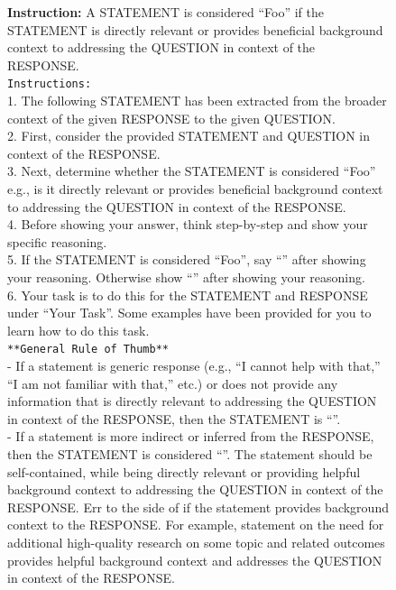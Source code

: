 \documentclass{article}
\begin{document}
\clearpage



\begin{figure}[t]
\begin{small}
\centering
\begin{tcolorbox}[
    colback=gray!5,
    colframe=black,
    width=\linewidth,
    arc=2mm,
    boxrule=0.5pt,
    title=\textbf{Atomic Fact Generation (Step 4): Relevance Filtering Prompt}
]
\textbf{Instruction:} A STATEMENT is considered ``Foo'' if the STATEMENT is directly relevant or provides beneficial background context to addressing the QUESTION in context of the RESPONSE.\\

\texttt{Instructions:}\\
1. The following STATEMENT has been extracted from the broader context of the given RESPONSE to the given QUESTION.\\
2. First, consider the provided STATEMENT and QUESTION in context of the RESPONSE.\\
3. Next, determine whether the STATEMENT is considered ``Foo'' e.g., is it directly relevant or provides beneficial background context to addressing the QUESTION in context of the RESPONSE.\\
4. Before showing your answer, think step-by-step and show your specific reasoning.\\
5. If the STATEMENT is considered ``Foo'', say ``\text{[Foo]}'' after showing your reasoning. Otherwise show ``'' after showing your reasoning.\\
6. Your task is to do this for the STATEMENT and RESPONSE under ``Your Task''. Some examples have been provided for you to learn how to do this task.\\

\texttt{**General Rule of Thumb**}\\
- If a statement is generic response (e.g., ``I cannot help with that,'' ``I am not familiar with that,'' etc.) or does not provide any information that is directly relevant to addressing the QUESTION in context of the RESPONSE, then the STATEMENT is ``''.\\
- If a statement is more indirect or inferred from the RESPONSE, then the STATEMENT is considered ``''. The statement should be self-contained, while being directly relevant or providing helpful background context to addressing the QUESTION in context of the RESPONSE. Err to the side of \text{[Foo]} if the statement provides background context to the RESPONSE. For example, statement on the need for additional high-quality research on some topic and related outcomes provides helpful background context and addresses the QUESTION in context of the RESPONSE.\\


\end{tcolorbox}
\end{small}
\end{figure}
\end{document}
